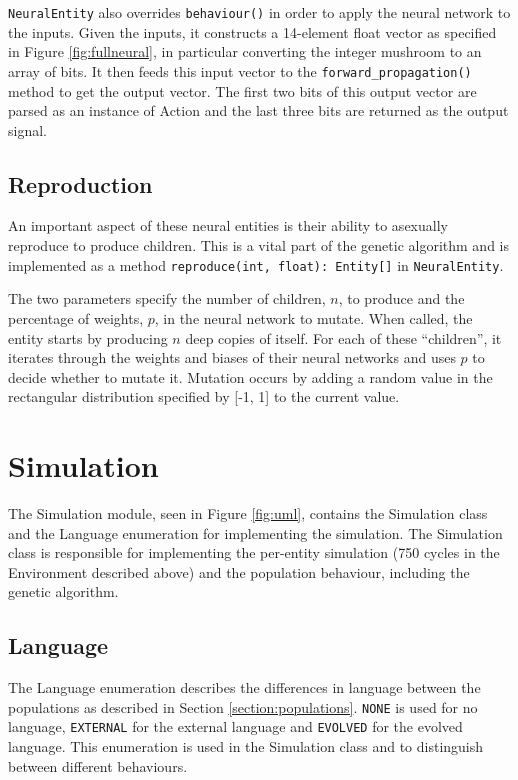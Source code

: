 \documentclass[12pt,a4paper,twoside,openright]{report}
\begin{document}
\texttt{NeuralEntity} also overrides \texttt{behaviour()} in order to apply the neural network to the inputs. Given the inputs, it constructs a 14-element float vector as specified in Figure \ref{fig:fullneural}, in particular converting the integer mushroom to an array of bits. It then feeds this input vector to the \texttt{forward\_propagation()} method to get the output vector. The first two bits of this output vector are parsed as an instance of Action and the last three bits are returned as the output signal.

\subsection{Reproduction}

An important aspect of these neural entities is their ability to asexually reproduce to produce children. This is a vital part of the genetic algorithm and is implemented as a method \texttt{reproduce(int, float): Entity[]} in \texttt{NeuralEntity}.

The two parameters specify the number of children, $n$, to produce and the percentage of weights, $p$, in the neural network to mutate. When called, the entity starts by producing $n$ deep copies of itself. For each of these ``children'', it iterates through the weights and biases of their neural networks and uses $p$ to decide whether to mutate it. Mutation occurs by adding a random value in the rectangular distribution specified by [-1, 1] to the current value.

\section{Simulation}\label{section:simulation}

The Simulation module, seen in Figure \ref{fig:uml}, contains the Simulation class and the Language enumeration for implementing the simulation. The Simulation class is responsible for implementing the per-entity simulation (750 cycles in the Environment described above) and the population behaviour, including the genetic algorithm.

\subsection{Language}

The Language enumeration describes the differences in language between the populations as described in Section \ref{section:populations}. \texttt{NONE} is used for no language, \texttt{EXTERNAL} for the external language and \texttt{EVOLVED} for the evolved language. This enumeration is used in the Simulation class and to distinguish between different behaviours.
\end{document}
